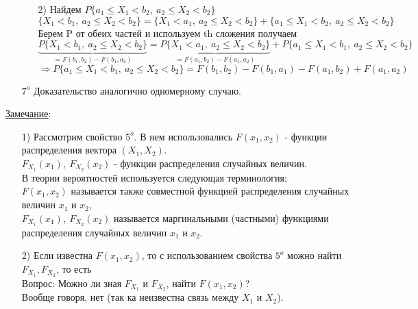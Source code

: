 \begin{enumerate}
\begin{enumerate}
	\item[2)] Найдем $P\{a_1 \leqslant X_1 < b_2, \ a_2 \leqslant X_2 < b_2\}$ \\
	$\{X_1 < b_1, \ a_2 \leqslant X_2 < b_2\} = \{X_1 < a_1, \ a_2 \leqslant X_2 < b_2\} + \{a_1 \leqslant X_1 < b_2, \ a_2 \leqslant X_2 < b_2\}$ \\ %
	Берем P от обеих частей и используем th сложения получаем \\
	$ \underbrace{P\{X_1 < b_1, \ a_2 \leqslant X_2 < b_2\}}_{= F(b_1, b_2) - F(b_1, a_2)} = \underbrace{P\{X_1 < a_1, \ a_2 \leqslant X_2 < b_2\}}_{= F(a_1, b_2) - F(a_1, a_2)} + P\{a_1 \leqslant X_1 < b_1, \ a_2 \leqslant X_2 < b_2\}$ \\
	$\Rightarrow P\{a_1 \leqslant X_1 < b_1, \ a_2 \leqslant X_2 < b_2\} = F(b_1, b_2) - F(b_1, a_1) - F(a_1, b_2) + F(a_1, a_2)$ \\
	\end{enumerate}
	
\item[$7^o$] Доказательство аналогично одномерному случаю.	
\end{enumerate}

\underline{Замечание}:
\begin{enumerate}
\item[1)] Рассмотрим свойство $5^o$. В нем использовались $F(x_1, x_2)$ - функции распределения вектора $(X_1, X_2)$. \\
$F_{X_1}(x_1), \ F_{X_2}(x_2)$ - функции распределения случайных величин. \\
В теории вероятностей используется следующая терминология: \\
$F(x_1, x_2)$ называется также совместной функцией распределения случайных величин $x_1$ и $x_2$, \\
$F_{X_1}(x_1), \ F_{X_2}(x_2)$ называется маргинальными (частными) функциями распределения случайных величин $x_1$ и $x_2$.

\item[2)] Если известна $F(x_1, x_2)$, то с использованием свойства $5^o$ можно найти $F_{X_1}, F_{X_2}$, то есть \\
Вопрос: Можно ли зная $F_{X_1}$ и $F_{X_2}$, найти $F(x_1, x_2)$? \\
Вообще говоря, нет (так ка неизвестна связь между $X_1$ и $X_2$).
\end{enumerate}























